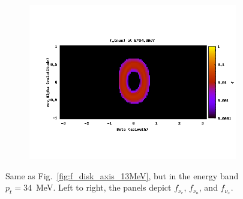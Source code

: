 \begin{figure}
\begin{subfigure}{.3\textwidth}
    \includegraphics[width=1\linewidth]{Figures/f_nux-A-34MeV}
  \end{subfigure}
  \caption[$f_\nu$ for the disk, from the rotation axis: sky map at high energy]{
    Same as Fig.~\ref{fig:f_disk_axis_13MeV}, but in the energy band $p_t=34$~MeV.
    Left to right, the panels depict $f_{\nu_e}$, $f_{\nu_a}$, and $f_{\nu_x}$.
  }
  \label{fig:f_disk_axis_34MeV}
\end{figure}


